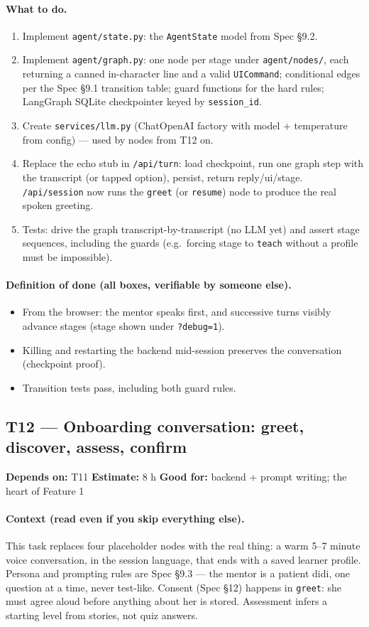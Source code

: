 \documentclass[11pt]{article}
\newcommand{\code}[1]{\texttt{#1}}
\newcommand{\taskmeta}[3]{\noindent\textbf{Depends on:} #1 \quad\textbullet\quad \textbf{Estimate:} #2 \quad\textbullet\quad \textbf{Good for:} #3\par\vspace{2pt}}
\newcommand{\ctx}[1]{\paragraph{Context (read even if you skip everything else).} #1}
\newcommand{\dod}{\paragraph{Definition of done (all boxes, verifiable by someone else).}}
\begin{document}
\paragraph{What to do.}
\begin{enumerate}
  \item Implement \code{agent/state.py}: the \code{AgentState} model from Spec \S9.2.
  \item Implement \code{agent/graph.py}: one node per stage under \code{agent/nodes/}, each returning a canned in-character line and a valid \code{UICommand}; conditional edges per the Spec \S9.1 transition table; guard functions for the hard rules; LangGraph SQLite checkpointer keyed by \code{session\_id}.
  \item Create \code{services/llm.py} (ChatOpenAI factory with model + temperature from config) --- used by nodes from T12 on.
  \item Replace the echo stub in \code{/api/turn}: load checkpoint, run one graph step with the transcript (or tapped option), persist, return reply/ui/stage. \code{/api/session} now runs the \code{greet} (or \code{resume}) node to produce the real spoken greeting.
  \item Tests: drive the graph transcript-by-transcript (no LLM yet) and assert stage sequences, including the guards (e.g.\ forcing stage to \code{teach} without a profile must be impossible).
\end{enumerate}
\dod
\begin{itemize}
  \item From the browser: the mentor speaks first, and successive turns visibly advance stages (stage shown under \code{?debug=1}).
  \item Killing and restarting the backend mid-session preserves the conversation (checkpoint proof).
  \item Transition tests pass, including both guard rules.
\end{itemize}

\subsection{T12 --- Onboarding conversation: greet, discover, assess, confirm}
\taskmeta{T11}{8 h}{backend + prompt writing; the heart of Feature 1}
\ctx{This task replaces four placeholder nodes with the real thing: a warm 5--7 minute voice conversation, in the session language, that ends with a saved learner profile. Persona and prompting rules are Spec \S9.3 --- the mentor is a patient didi, one question at a time, never test-like. Consent (Spec \S12) happens in \code{greet}: she must agree aloud before anything about her is stored. Assessment infers a starting level from stories, not quiz answers.}
\end{document}
